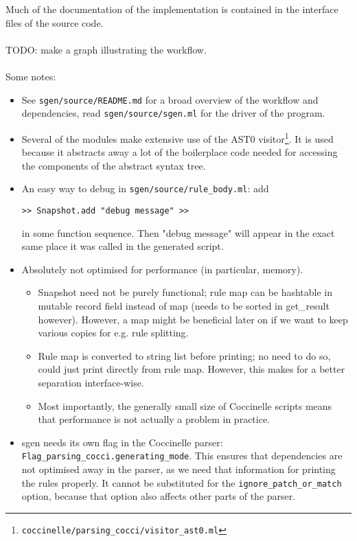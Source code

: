 Much of the documentation of the implementation is contained in the interface files of the source code.\\\\
TODO: make a graph illustrating the workflow.\\\\
Some notes:
\begin{itemize}
\item See \texttt{sgen/source/README.md} for a broad overview of the workflow and dependencies, read \texttt{sgen/source/sgen.ml} for the driver of the program.
\item Several of the modules make extensive use of the AST0 visitor\footnote{\texttt{coccinelle/parsing\_cocci/visitor\_ast0.ml}}. It is used because it abstracts away a lot of the boilerplace code needed for accessing the components of the abstract syntax tree.
\item An easy way to debug in \texttt{sgen/source/rule\_body.ml}: add
\begin{verbatim}
>> Snapshot.add "debug message" >>
\end{verbatim}
in some function sequence. Then "debug message" will appear in the exact same place it was called in the generated script.
\item Absolutely not optimised for performance (in particular, memory).
  \begin{itemize}
  \item Snapshot need not be purely functional; rule map can be hashtable in mutable record field instead of map (needs to be sorted in get\_result however). However, a map might be beneficial later on if we want to keep various copies for e.g. rule splitting.
  \item Rule map is converted to string list before printing; no need to do so, could just print directly from rule map. However, this makes for a better separation interface-wise.
  \item Most importantly, the generally small size of Coccinelle scripts means that performance is not actually a problem in practice.
  \end{itemize}
\item sgen needs its own flag in the Coccinelle parser: \texttt{Flag\_parsing\_cocci.generating\_mode}. This ensures that dependencies are not optimised away in the parser, as we need that information for printing the rules properly. It cannot be substituted for the \texttt{ignore\_patch\_or\_match} option, because that option also affects other parts of the parser.
\end{itemize}

